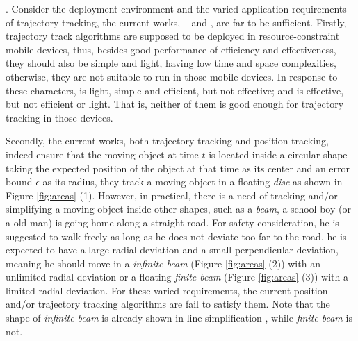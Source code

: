 . Consider the deployment environment and the varied application requirements of trajectory tracking, the current works, \ie~\ldrh \cite{Trajcevski:LDRH} and \grts \cite{Lange:GRTS,Lange:Tracking}, are far to be sufficient. Firstly, trajectory track algorithms are supposed to be deployed in resource-constraint mobile devices, thus, besides good performance of efficiency and effectiveness, they should also be simple and light, \ie having low time and space complexities, otherwise, they are not suitable to run in those mobile devices. In response to these characters, \ldrh is light, simple and efficient, but not effective; and \grts is effective, but not efficient or light. That is, neither of them is good enough for trajectory tracking in those devices.

Secondly, the current works, both trajectory tracking and position tracking, indeed ensure that the moving object at time $t$ is located inside a circular shape taking the expected position of the object at that time as its center and an error bound $\epsilon$ as its radius, \ie they track a moving object in a floating \emph{disc} as shown in Figure \ref{fig:areas}-(1). 
%
However, in practical, there is a need of tracking and/or simplifying a moving object inside other shapes, such as a \emph{beam}, \eg a school boy (or a old man) is going home along a straight road. For safety consideration, he is suggested to walk freely as long as he does not deviate too far to the road, \ie he is expected to have a large radial deviation and a small perpendicular deviation, meaning he should move in a \emph{infinite beam} \cite{Chen:Space,Daescu:metric} (Figure \ref{fig:areas}-(2)) with an unlimited radial deviation or a floating \emph{finite beam} (Figure \ref{fig:areas}-(3)) with a limited radial deviation.
%
For these varied requirements, the current position and/or trajectory tracking algorithms are fail to satisfy them. Note that the shape of \emph{infinite beam} is already shown in line simplification \cite{Chen:Space,Daescu:metric}, while \emph{finite beam} is not.



